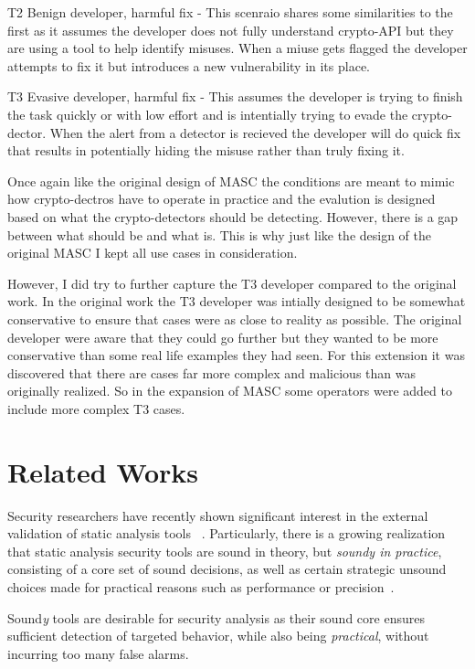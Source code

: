 T2 Benign developer, harmful fix - This scenraio shares some similarities to the first as it assumes the developer does not fully understand crypto-API but they are using a tool to help identify misuses. When a miuse gets flagged the developer attempts to fix it but introduces a new vulnerability in its place.

T3 Evasive developer, harmful fix - This assumes the developer is trying to finish the task quickly or with low effort and is intentially trying to evade the crypto-dector. When the alert from a detector is recieved the developer will do quick fix that results in potentially hiding the misuse rather than truly fixing it.

Once again like the original design of MASC the conditions are meant to mimic how crypto-dectros have to operate in practice and the evalution is designed based on what the crypto-detectors should be detecting. However, there is a gap between what should be and what is. This is why just like the design of the original MASC I kept all use cases in consideration. 

However, I did try to further capture the T3 developer compared to the original work. In the original work the T3 developer was intially designed to be somewhat conservative to ensure that cases were as close to reality as possible. The original developer were aware that they could go further but they wanted to be more conservative than some real life examples they had seen. For this extension it was discovered that there are cases far more complex and malicious than was originally realized. So in the expansion of MASC some operators were added to include more complex T3 cases.

\section{Related Works}
\label{ch1:sec:relatedworks}

Security researchers have recently shown significant interest in the external validation of static analysis tools
 ~\cite{QWR18,droidbench,iccbench,PBW18,bkm+18,}. %
Particularly, there is a growing realization that static analysis security tools are sound in theory, but {\em soundy in practice}, \ie consisting of a core set of sound decisions, as well as certain strategic unsound choices made for practical reasons such as performance or precision~\cite{lss+15}.

Sound{\em y} tools are desirable for security analysis as their sound core ensures sufficient detection of targeted behavior, while also being {\em practical}, \ie without incurring too many false alarms.


